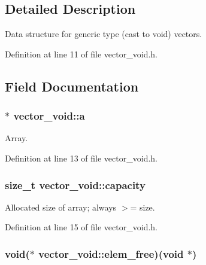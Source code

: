 \subsection{\-Detailed \-Description}
\-Data structure for generic type (cast to void) vectors. 

\-Definition at line 11 of file vector\-\_\-void.\-h.



\subsection{\-Field \-Documentation}
\hypertarget{structvector__void_aae6cbf085d4de1f6ba3adab1aa7c7585}{
\subsubsection[{a}]{$\ast$ {\bf vector\-\_\-void\-::a}}}\label{structvector__void_aae6cbf085d4de1f6ba3adab1aa7c7585}


\-Array. 



\-Definition at line 13 of file vector\-\_\-void.\-h.

\hypertarget{structvector__void_a440146243caeb1d285111fdd54e1006f}{
\subsubsection[{capacity}]{\setlength{\rightskip}{0pt plus 5cm}size\-\_\-t {\bf vector\-\_\-void\-::capacity}}}\label{structvector__void_a440146243caeb1d285111fdd54e1006f}


\-Allocated size of array; always $>$= size. 



\-Definition at line 15 of file vector\-\_\-void.\-h.

\hypertarget{structvector__void_abed2ac06e76256419b825b31e879b204}{
\subsubsection[{elem\-\_\-free}]{\setlength{\rightskip}{0pt plus 5cm}void($\ast$ {\bf vector\-\_\-void\-::elem\-\_\-free})(void $\ast$)}}\label{structvector__void_abed2ac06e76256419b825b31e879b204}


